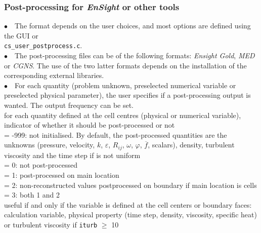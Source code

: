 \subsubsection{Post-processing for {\em EnSight} or other tools}

$\bullet\quad$The format depends on the user choices, and most options
are defined using the GUI or \\
\texttt{cs\_user\_postprocess.c}.\\
$\bullet\quad$The post-processing files can be of the following formats: {\em Ensight Gold},
{\em MED} or {\em CGNS}. The use of the two latter formats depends on
the installation of the corresponding external libraries.\\
$\bullet\quad$For each quantity (problem unknown, preselected numerical
variable or preselected physical parameter), the user specifies if a
post-processing output is wanted. The output frequency can be set.\\

{for each quantity defined at the cell centres (physical or numerical
variable), indicator of whether it should be post-processed or not \\
\hspace*{1.3cm}= -999: not initialised. By default, the post-processed
quantities are the unknowns (pressure, velocity, $k$, $\varepsilon$,
$R_{ij}$, $\omega$, $\varphi$, $\overline{f}$, scalars), density,
turbulent viscosity and the time step if is not uniform\\
\hspace*{1.3cm}= 0: not post-processed\\
\hspace*{1.3cm}= 1: post-processed on main location\\
\hspace*{1.3cm}= 2: non-reconstructed values postprocessed on boundary if main location is cells\\
\hspace*{1.3cm}= 3: both 1 and 2\\
useful if and only if the variable is defined at the cell centers or boundary faces:
calculation variable, physical property (time step, density,
viscosity, specific heat) or turbulent viscosity if {\tt iturb}
$\geqslant$ 10}

